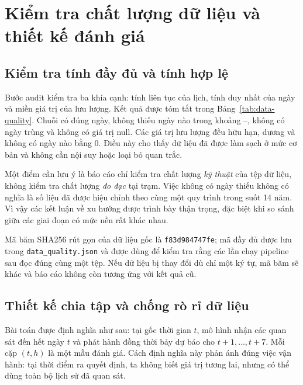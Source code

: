 \section{Kiểm tra chất lượng dữ liệu và thiết kế đánh giá}
\label{sec:audit}

\subsection{Kiểm tra tính đầy đủ và tính hợp lệ}

Bước audit kiểm tra ba khía cạnh: tính liên tục của lịch, tính duy nhất của ngày và
miền giá trị của lưu lượng. Kết quả được tóm tắt trong
Bảng~\ref{tab:data-quality}. Chuỗi có đúng \DatasetN{} ngày, không thiếu ngày nào
trong khoảng \DateMin{}--\DateMax{}, không có ngày trùng và không có giá trị null.
Các giá trị lưu lượng đều hữu hạn, dương và không có ngày nào bằng 0. Điều này cho
thấy dữ liệu đã được làm sạch ở mức cơ bản và không cần nội suy hoặc loại bỏ quan
trắc.

\begin{table}[H]
\centering
\small

\caption{Kết quả kiểm tra chất lượng dữ liệu gốc.}
\label{tab:data-quality}
\end{table}

Một điểm cần lưu ý là báo cáo chỉ kiểm tra chất lượng \emph{kỹ thuật} của tệp dữ liệu,
không kiểm tra chất lượng \emph{đo đạc} tại trạm. Việc không có ngày thiếu không có
nghĩa là số liệu đã được hiệu chỉnh theo cùng một quy trình trong suốt 14 năm. Vì
vậy các kết luận về xu hướng được trình bày thận trọng, đặc biệt khi so sánh giữa
các giai đoạn có mức nền rất khác nhau.

Mã băm SHA256 rút gọn của dữ liệu gốc là \texttt{f83d984747fe}; mã đầy đủ được lưu
trong \texttt{data\_quality.json} và được dùng để kiểm tra rằng
các lần chạy pipeline sau đọc đúng cùng một tệp. Nếu dữ liệu bị thay đổi dù chỉ một
ký tự, mã băm sẽ khác và báo cáo không còn tương ứng với kết quả cũ.

\subsection{Thiết kế chia tập và chống rò rỉ dữ liệu}

Bài toán được định nghĩa như sau: tại gốc thời gian $t$, mô hình nhận các quan sát
đến hết ngày $t$ và phát hành đồng thời bảy dự báo cho $t+1,\ldots,t+7$. Mỗi cặp
$(t,h)$ là một mẫu đánh giá. Cách định nghĩa này phản ánh đúng việc vận hành: tại
thời điểm ra quyết định, ta không biết giá trị tương lai, nhưng có thể dùng toàn bộ
lịch sử đã quan sát.

